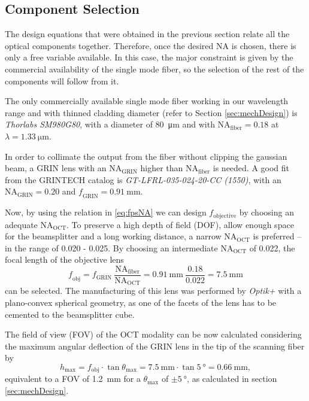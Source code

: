 \subsection{Component Selection}
The design equations that were obtained in the previous section relate all the optical components together. Therefore, once the desired NA is chosen, there is only a free variable available. In this case, the major constraint is given by the commercial availability of the single mode fiber, so the selection of the rest of the components will follow from it.

The only commercially available single mode fiber working in our wavelength range and with thinned cladding diameter (refer to Section \ref{sec:mechDesign}) is \textit{Thorlabs SM980G80}, with a diameter of \SI{80}{\micro\meter} and with $\mathrm{NA_\mathrm{fiber}} = 0.18$ at $\lambda = \SI{1.33}{\micro\meter}$. 

In order to collimate the output from the fiber without clipping the gaussian beam, a GRIN lens with an $\mathrm{NA_{GRIN}}$ higher than $\mathrm{NA_{fiber}}$ is needed. A good fit from the GRINTECH catalog is \textit{GT-LFRL-035-024-20-CC (1550)}, with an $\mathrm{NA_\mathrm{GRIN}} = 0.20$ and $\mathit{f_\mathrm{GRIN}} = \SI{0.91}{\milli\meter}$. 

Now, by using the relation in \autoref{eq:fpsNA} we can design $f_\mathrm{objective}$ by choosing an adequate $\mathrm{NA_\mathrm{OCT}}$. To preserve a high depth of field (DOF), allow enough space for the beamsplitter and a long working distance, a narrow $\mathrm{NA_\mathrm{OCT}}$ is preferred -- in the range of 0.020 - 0.025. By choosing an intermediate $\mathrm{NA_\mathrm{OCT}}$ of 0.022, the focal length of the objective lens 
\begin{equation}
\mathit{f_\mathrm{obj}} = f_\mathrm{GRIN}\ \frac{\mathrm{NA_\mathrm{fiber}}}{\mathrm{NA_\mathrm{OCT}}}  = \SI{0.91}{\milli\meter}\ \frac{0.18}{0.022} = \SI{7.5}{\milli\meter}
\end{equation}
can be selected. The manufacturing of this lens was performed by \textit{Optik+} with a plano-convex spherical geometry, as one of the facets of the lens has to be cemented to the beamsplitter cube.

The field of view (FOV) of the OCT modality can be now calculated considering the maximum angular deflection of the GRIN lens in the tip of the scanning fiber by 
\begin{equation}
h_\mathrm{max} = f_\mathrm{obj}\cdot \tan  \theta_\mathrm{max} = \SI{7.5}{\milli\meter} \cdot \tan \SI{5}{\degree} = \SI{0.66}{\milli\meter}, 
\end{equation}
equivalent to a FOV of \SI{1.2}{\milli\meter} for a $\theta_\mathrm{max} $ of $ \pm \SI{5}{\degree}$, as calculated in section \ref{sec:mechDesign}.



